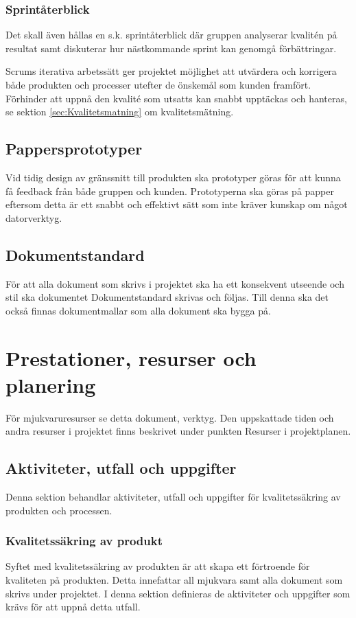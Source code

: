 \documentclass[a4paper,10pt]{article}
\begin{document}
\subsubsection{Sprintåterblick}

Det skall även hållas en s.k. sprintåterblick där gruppen analyserar kvalitén på resultat samt diskuterar hur nästkommande sprint kan genomgå förbättringar.

Scrums iterativa arbetssätt ger projektet möjlighet att utvärdera och korrigera både produkten och processer utefter de önskemål som kunden framfört. Förhinder att uppnå den kvalité som utsatts kan snabbt upptäckas och hanteras, se sektion \ref{sec:Kvalitetsmatning} om kvalitetsmätning.

\subsection{Pappersprototyper}
Vid tidig design av gränssnitt till produkten ska prototyper göras för att kunna få feedback från både gruppen och kunden. Prototyperna ska göras på papper eftersom detta är ett snabbt och effektivt sätt som inte kräver kunskap om något datorverktyg.

\subsection{Dokumentstandard}
För att alla dokument som skrivs i projektet ska ha ett konsekvent utseende och stil ska dokumentet Dokumentstandard skrivas och följas. Till denna ska det också finnas dokumentmallar som alla dokument ska bygga på.

\section{Prestationer, resurser och planering}
\vspace{5mm}
För mjukvaruresurser se detta dokument, verktyg. 
Den uppskattade tiden och andra resurser i projektet finns beskrivet under punkten Resurser i projektplanen. 

\subsection{Aktiviteter, utfall och uppgifter}
Denna sektion behandlar aktiviteter, utfall och uppgifter för kvalitetssäkring av produkten och processen. 
\subsubsection{Kvalitetssäkring av produkt}
Syftet med kvalitetssäkring av produkten är att skapa ett förtroende för kvaliteten på produkten. Detta innefattar all mjukvara samt alla dokument som skrivs under projektet. I denna sektion definieras de aktiviteter och uppgifter som krävs för att uppnå detta utfall.
\end{document}
